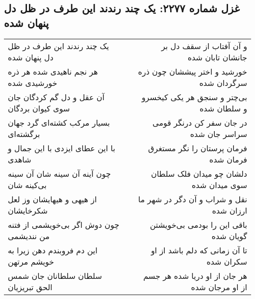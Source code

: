 \begin{center}
\section*{غزل شماره ۲۲۷۷: یک چند رندند این طرف در ظل دل پنهان شده}
\label{sec:2277}
\begin{longtable}{l p{0.5cm} r}
یک چند رندند این طرف در ظل دل پنهان شده
&&
و آن آفتاب از سقف دل بر جانشان تابان شده
\\
هر نجم ناهیدی شده هر ذره خورشیدی شده
&&
خورشید و اختر پیششان چون ذره سرگردان شده
\\
آن عقل و دل گم کردگان جان سوی کیوان بردگان
&&
بی‌چتر و سنجق هر یکی کیخسرو و سلطان شده
\\
بسیار مرکب کشته‌ای گرد جهان برگشته‌ای
&&
در جان سفر کن درنگر قومی سراسر جان شده
\\
با این عطای ایزدی با این جمال و شاهدی
&&
فرمان پرستان را نگر مستغرق فرمان شده
\\
چون آینه آن سینه شان آن سینه بی‌کینه شان
&&
دلشان چو میدان فلک سلطان سوی میدان شده
\\
از هیهی و هیهایشان وز لعل شکرخایشان
&&
نقل و شراب و آن دگر در شهر ما ارزان شده
\\
چون دوش اگر بی‌خویشمی از فتنه من نندیشمی
&&
باقی این را بودمی بی‌خویشتن گویان شده
\\
این دم فروبندم دهن زیرا به خویشم مرتهن
&&
تا آن زمانی که دلم باشد از او سکران شده
\\
سلطان سلطانان جان شمس الحق تبریزیان
&&
هر جان از او دریا شده هر جسم از او مرجان شده
\\
\end{longtable}
\end{center}
